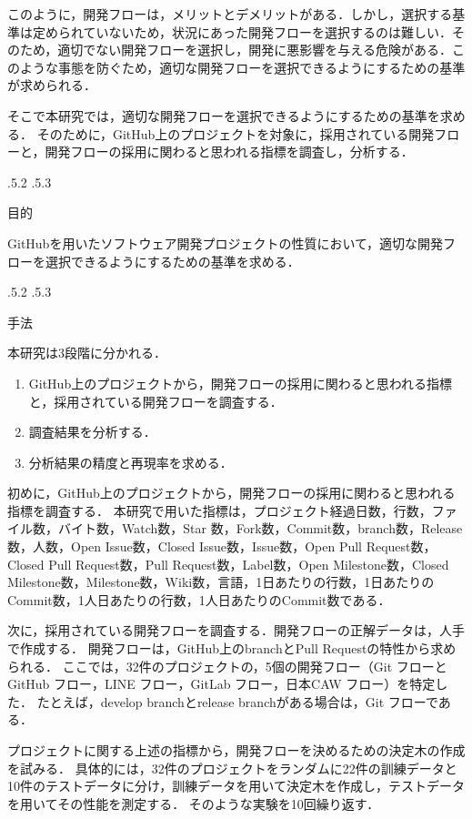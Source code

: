 \documentclass[uplatex,twocolumn]{jsarticle}
\makeatletter
\renewcommand{\section}{%
    \if@slide\clearpage\fi
    \@startsection{section}{1}{\z@}%
    {\Cvs \@plus.5\Cdp \@minus.2\Cdp}%
    {.5\Cvs \@plus.3\Cdp}%
    {\normalfont\raggedright}}
\makeatother
\begin{document}
このように，開発フローは，メリットとデメリットがある．しかし，選択する基準は定められていないため，状況にあった開発フローを選択するのは難しい．そのため，適切でない開発フローを選択し，開発に悪影響を与える危険がある．このような事態を防ぐため，適切な開発フローを選択できるようにするための基準が求められる．


そこで本研究では，適切な開発フローを選択できるようにするための基準を求める．
そのために，GitHub上のプロジェクトを対象に，採用されている開発フローと，開発フローの採用に関わると思われる指標を調査し，分析する．

\section{目的}

GitHubを用いたソフトウェア開発プロジェクトの性質において，適切な開発フローを選択できるようにするための基準を求める．

\section{手法}


本研究は3段階に分かれる．
\begin{enumerate}
\item GitHub上のプロジェクトから，開発フローの採用に関わると思われる指標と，採用されている開発フローを調査する．
\item 調査結果を分析する．
\item 分析結果の精度と再現率を求める． 
\end{enumerate}

初めに，GitHub上のプロジェクトから，開発フローの採用に関わると思われる指標を調査する．
本研究で用いた指標は，プロジェクト経過日数，行数，ファイル数，バイト数，Watch数，Star 数，Fork数，Commit数，branch数，Release数，人数，Open Issue数，Closed Issue数，Issue数，Open Pull Request数，Closed Pull Request数，Pull Request数，Label数，Open Milestone数，Closed Milestone数，Milestone数，Wiki数，言語，1日あたりの行数，1日あたりのCommit数，1人日あたりの行数，1人日あたりのCommit数である．

次に，採用されている開発フローを調査する．開発フローの正解データは，人手で作成する．
開発フローは，GitHub上のbranchとPull Requestの特性から求められる．
ここでは，32件のプロジェクトの，5個の開発フロー（Git フローとGitHub フロー，LINE フロー，GitLab フロー，日本CAW フロー）を特定した．
たとえば，develop branchとrelease branchがある場合は，Git フローである．

プロジェクトに関する上述の指標から，開発フローを決めるための決定木の作成を試みる．
具体的には，32件のプロジェクトをランダムに22件の訓練データと10件のテストデータに分け，訓練データを用いて決定木を作成し，テストデータを用いてその性能を測定する．
そのような実験を10回繰り返す．
\end{document}

